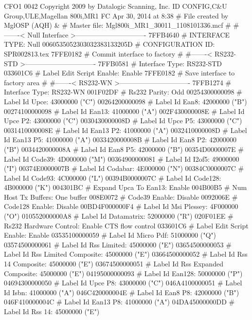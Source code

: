 CFO1 0042
Copyright 2009 by Datalogic Scanning, Inc.
ID CONFIG,C&U Group,ULE,Magellan 800i,MR1
FC Apr 30, 2014 at 8:38
# File created by MglOSP (AQH)
&
# Master file: Mgl800i_MR1_30011_1108101336.mcf
#
#-------< Null Interface >-------------------------------
7FFB4640            # INTERFACE TYPE: Null
0060535052303032383133205D # CONFIGURATION ID: SPR002813.tex
7FFE0182            # Commit interface to factory
#
#-------< RS232-STD >-------------------------------
7FFB0581            # Interface Type: RS232-STD
033601C6            # Label Edit Script Enable: Enable
7FFE0182            # Save interface to factory area
#
#-------< RS232-WN >-------------------------------
7FFB1274            # Interface Type: RS232-WN
001F02DF            # Rs232 Parity: Odd
00254300000098      # Label Id Upce: 43000000 ("C")
00264200000098      # Label Id Ean8: 42000000 ("B")
00274100000098      # Label Id Ean13: 41000000 ("A")
002F430000008E      # Label Id Upce P2: 43000000 ("C")
0030430000008D      # Label Id Upce P5: 43000000 ("C")
0031410000008E      # Label Id Ean13 P2: 41000000 ("A")
0032410000008D      # Label Id Ean13 P5: 41000000 ("A")
0033420000008B      # Label Id Ean8 P2: 42000000 ("B")
0034420000008A      # Label Id Ean8 P5: 42000000 ("B")
00354D0000007E      # Label Id Code39: 4D000000 ("M")
00364900000081      # Label Id I2of5: 49000000 ("I")
00374E0000007B      # Label Id Codabar: 4E000000 ("N")
00384C0000007C      # Label Id Code93: 4C000000 ("L")
00394B0000007C      # Label Id Code128: 4B000000 ("K")
004301BC            # Expand Upca To Ean13: Enable
004B00B5            # Num Host Tx Buffers: One buffer
008E0072            # Code39 Enable: Disable
0092006E            # Code128 Enable: Disable
00BD4F000000F4      # Label Id Msi Plessey: 4F000000 ("O")
010552000000A8      # Label Id Datamatrix: 52000000 ("R")
020F01EE            # Rs232 Hardware Control: Enable CTS flow control
033601C6            # Label Edit Script Enable: Enable
03535100000059      # Label Id Micro Pdf: 51000000 ("Q")
03574500000061      # Label Id Rss Limited: 45000000 ("E")
03654500000053      # Label Id Rss Limited Composite: 45000000 ("E")
03664500000052      # Label Id Rss 14 Composite: 45000000 ("E")
03674500000051      # Label Id Rss Expanded Composite: 45000000 ("E")
04195000000093      # Label Id Ean128: 50000000 ("P")
04694300000050      # Label Id Upce P8: 43000000 ("C")
046A4100000051      # Label Id Isbn: 41000000 ("A")
046C420000004E      # Label Id Ean8 P8: 42000000 ("B")
046F410000004C      # Label Id Ean13 P8: 41000000 ("A")
04DA45000000DD      # Label Id Rss 14: 45000000 ("E")
